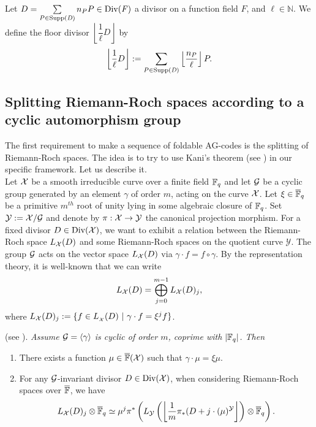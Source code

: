 \documentclass[10pt]{article}
\begin{document}
\s

\begin{def1} \label{floor divisor}
Let $D = \sum\limits_{P \in \rm Supp\it (D)} n_P P \in \rm Div \it(F)$ a divisor on a function field $F$, and $\ell \in \mathbb{N}$. We define the floor divisor $\left\lfloor \dfrac{1}{\ell}D \right\rfloor$ by 
\[ \left\lfloor \frac{1}{\ell}D \right\rfloor := \sum\limits_{P \in \rm Supp \it (D)} \left\lfloor \frac{n_P}{\ell} \right\rfloor P.\]
\end{def1}

\s

\subsection{Splitting Riemann-Roch spaces according to a cyclic automorphism group}

\s

The first requirement to make a sequence of foldable AG-codes is the splitting of Riemann-Roch spaces. The idea is to try to use Kani's theorem (see \cite{K86}) in our specific framework. Let us describe it. \\
Let $\mathcal{X}$ be a smooth irreducible curve over a finite field $\mathbb{F}_q$ and let $\mathcal{G}$ be a cyclic group generated by an element $\gamma$ of order $m$, acting on the curve $\mathcal{X}$. Let $\xi \in \overline{\mathbb{F}}_q$ be a primitive $m^{th}$ root of unity lying in some algebraic closure of $\mathbb{F}_q$. Set $\mathcal{Y} := \mathcal{X}/\mathcal{G}$ and denote by $\pi : \mathcal{X} \rightarrow \mathcal{Y}$ the canonical projection morphism. For a fixed divisor $D \in \rm Div \it (\mathcal{X})$, we want to exhibit a relation between the Riemann-Roch space $L_{\mathcal{X}}(D)$ and some Riemann-Roch spaces on the quotient curve $\mathcal{Y}$. The group $\mathcal{G}$ acts on the vector space $L_{\mathcal{X}}(D)$ via $\gamma \cdot f = f \circ \gamma$. By the representation theory, it is well-known that we can write
\[L_{\mathcal{X}}(D) = \bigoplus\limits_{j=0}^{m-1} L_{\mathcal{X}}(D)_j ,\]
where $L_{\calX}(D)_j := \{ f \in L_{\cal_X}(D) \ | \ \gamma \cdot f = \xi^jf\}$.


\s

\begin{theorem} \rm (see \cite{K86}). \it \label{Kani}
Assume $\mathcal{G} = \langle \gamma \rangle$ is cyclic of order $m$, coprime with $|\mathbb{F}_q|$. Then 
\begin{enumerate}
\item There exists a function $\mu \in \overline{\mathbb{F}}(\mathcal{X})$ such that $\gamma \cdot \mu = \xi\mu$.
\item For any $\mathcal{G}$-invariant divisor $D \in \rm Div \it (\mathcal{X})$, when considering Riemann-Roch spaces over $\overline{\mathbb{F}}$, we have 
\begin{equation} \label{deckani}
L_{\mathcal{X}}(D)_j \otimes \overline{\mathbb{F}}_q \simeq \mu^j\pi^{*}\left(L_{\mathcal{Y}}\left(\left\lfloor \dfrac{1}{m} \pi_*(D+j \cdot (\mu)^{\mathcal{Y}}\right\rfloor \right) \otimes \overline{\mathbb{F}}_q \right).
\end{equation}
\end{enumerate}
\end{theorem}
\end{document}
